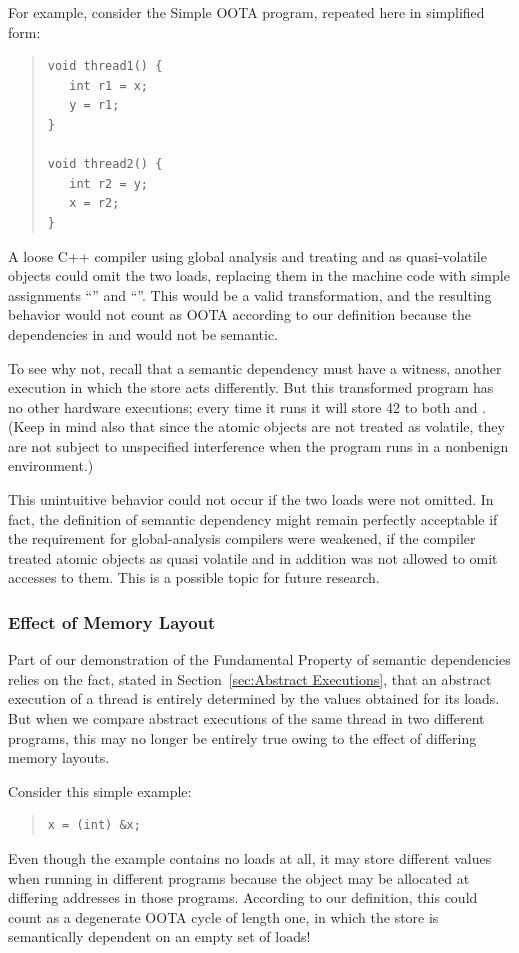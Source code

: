 \documentclass[10]{article}
\begin{document}
For example, consider the Simple OOTA program, repeated here in
simplified form:
\begin{quote}
\begin{verbatim}
void thread1() {
   int r1 = x;
   y = r1;
}

void thread2() {
   int r2 = y;
   x = r2;
}
\end{verbatim}
\end{quote}
A loose C++ compiler using global analysis and treating  and  as
quasi-volatile objects could omit the two loads, replacing them in the
machine code with simple assignments ``'' and
``''.
This would be a valid transformation, and the resulting behavior would
not count as OOTA according to our definition because the
dependencies in  and  would not be semantic.

To see why not, recall that a semantic dependency must have a witness,
another execution in which the store acts differently.
But this transformed program has no other hardware executions; every time it
runs it will store 42 to both  and .
(Keep in mind also that since the atomic objects are not treated as
volatile, they are not subject to unspecified interference when the
program runs in a nonbenign environment.)

This unintuitive behavior could not occur if the two loads were not
omitted.
In fact, the definition of semantic dependency might remain
perfectly acceptable if the requirement for global-analysis compilers
were weakened, if the compiler treated atomic objects as quasi
volatile and in addition was not allowed to omit accesses to them.
This is a possible topic for future research.

\subsubsection{Effect of Memory Layout}
\label{sec:Effect of Memory Layout}

Part of our demonstration of the Fundamental Property of semantic
dependencies relies on the fact, stated in
Section~\ref{sec:Abstract Executions},
that an abstract execution of a thread is entirely determined by the
values obtained for its loads.
But when we compare abstract executions of the same thread in two
different programs, this may no longer be entirely true owing to the
effect of differing memory layouts.

Consider this simple example:
\begin{quote}
\begin{verbatim}
x = (int) &x;
\end{verbatim}
\end{quote}
Even though the example contains no loads at all, it may store
different values when running in different programs because the
object  may be allocated at differing addresses in those
programs.
According to our definition, this could count as a degenerate OOTA
cycle of length one, in which the store is semantically dependent on
an empty set of loads!
\end{document}
